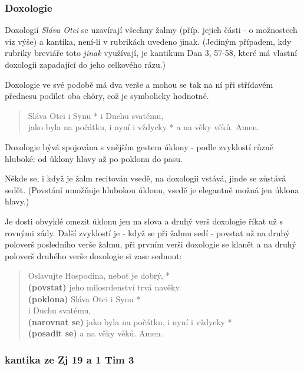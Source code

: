 \subsubsection{Doxologie}
\label{sec:doxologie}

Doxologií \emph{Sláva Otci} se uzavírají všechny žalmy (příp. jejich části -
o možnostech viz výše) a kantika, není-li v rubrikách uvedeno jinak.
(Jediným případem, kdy rubriky breviáře toto \emph{jinak} využívají,
je kantikum Dan 3, 57-58, které má vlastní doxologii
zapadající do jeho celkového rázu.)

Doxologie ve své  podobě má dva verše a mohou se tak na ní
při střídavém přednesu podílet oba chóry, což je symbolicky hodnotné.

\begin{quote}
Sláva Otci i Synu * i Duchu svatému,\\
jako byla na počátku, i nyní i vždycky * a na věky věků. Amen.
\end{quote}

Doxologie bývá spojována s vnějším gestem úklony - podle zvyklostí různě
hluboké: od ůklony hlavy až po poklonu do pasu.

Někde se, i když je žalm recitován vsedě, na doxologii vstává,
jinde se zůstává sedět. (Povstání umožňuje hlubokou úklonu, vsedě je
elegantně možná jen úklona hlavy.)

Je dosti obvyklé omezit úklonu jen na slova
 a druhý verš doxologie říkat už
s rovnými zády.
Další zvyklostí je - když se při žalmu sedí - povstat už na druhý poloverš
posledního verše žalmu, při prvním verši doxologie se klanět
a na druhý poloverš druhého verše doxologie si zase sednout:

\begin{quote}
Oslavujte Hospodina, neboť je dobrý, *\\
\textbf{(povstat)} jeho milosrdenství trvá navěky.\\

\textbf{(poklona)} Sláva Otci i Synu *\\
i Duchu svatému,\\

\textbf{(narovnat se)} jako byla na počátku, i nyní i vždycky *\\
\textbf{(posadit se)} a na věky věků. Amen.
\end{quote}


\subsubsection{ kantika ze Zj 19 a 1 Tim 3}
